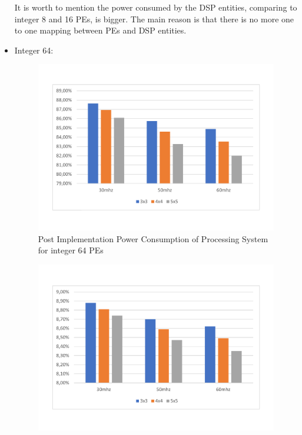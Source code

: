\begin{itemize}
It is worth to mention the power consumed by the DSP entities, comparing to integer 8 and 16 PEs, is bigger. The main reason is that there is no more one to one mapping between PEs and DSP entities.

\item Integer 64:
\begin{figure}[!htbp]
\centering
\captionsetup{justification=centering}
\includegraphics[scale=0.5,angle=0]{./figure/graphs/power_ps_int64_freq.pdf}
\caption{Post Implementation Power Consumption of Processing System for integer 64 PEs}
\label{fig:powint64}
\end{figure}
\begin{figure}[!htbp]
\centering
\captionsetup{justification=centering}
\includegraphics[scale=0.5,angle=0]{./figure/graphs/power_plstatic_int64_freq.pdf}

\end{figure}
\end{itemize}
